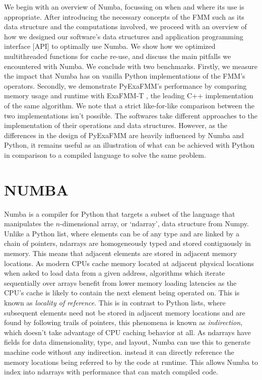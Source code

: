 \documentclass{IEEEcsmag}
\begin{document}
We begin with an overview of Numba, focussing on when and where its use is appropriate. After introducing the necessary concepts of the FMM such as its data structure and the computations involved, we proceed with an overview of how we designed our software's data structures and application programming interface [API] to optimally use Numba. We show how we optimized multithreaded functions for cache re-use, and discuss the main pitfalls we encountered with Numba. We conclude with two benchmarks. Firstly, we measure the impact that Numba has on vanilla Python implementations of the FMM's operators. Secondly, we demonstrate PyExaFMM's performance by comparing memory usage and runtime with ExaFMM-T \cite{Wang2021}, the leading C++ implementation of the same algorithm. We note that a strict like-for-like comparison between the two implementations isn't possible. The softwares take different approaches to the implementation of their operations and data structures. However, as the differences in the design of PyExaFMM are heavily influenced by Numba and Python, it remains useful as an illustration of what can be achieved with Python in comparison to a compiled language to solve the same problem.

\section{NUMBA}

Numba is a compiler for Python that targets a subset of the language that manipulates the $n$-dimensional array, or `ndarray', data structure from Numpy. Unlike a Python list, where elements can be of any type and are linked by a chain of pointers, ndarrays are homogeneously typed and stored contiguously in memory. This means that adjacent elements are stored in adjacent memory locations. As modern CPUs cache memory located at adjacent physical locations when asked to load data from a given address, algorithms which iterate sequentially over arrays benefit from lower memory loading latencies as the CPU's cache is likely to contain the next element being operated on. This is known as \textit{locality of reference}. This is in contrast to Python lists, where subsequent elements need not be stored in adjacent memory locations and are found by following trails of pointers, this phenomena is known as \textit{indirection}, which doesn't take advantage of CPU caching behavior at all. As ndarrays have fields for data dimensionality, type, and layout, Numba can use this to generate machine code without any indirection. instead it can directly reference the memory locations being referred to by the code at runtime. This allows Numba to index into ndarrays with performance that can match compiled code.
\end{document}
